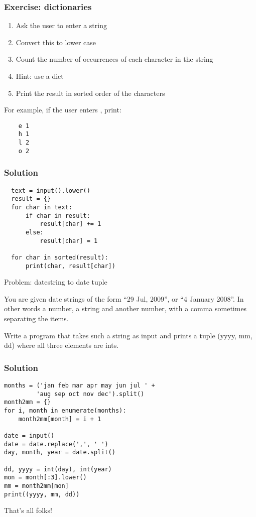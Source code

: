 \documentclass[14pt,compress]{beamer}
\begin{document}
\begin{frame}
  \frametitle{Exercise: dictionaries}
  \begin{enumerate}
  \item Ask the user to enter a string
  \item Convert this to lower case
  \item Count the number of occurrences of each character in the string
  \item Hint: use a dict
  \item Print the result in sorted order of the characters
  \end{enumerate}
  For example, if the user enters , print:
  \begin{lstlisting}
    e 1
    h 1
    l 2
    o 2
  \end{lstlisting}
\end{frame}

\begin{frame}
\frametitle{Solution}
\begin{lstlisting}
  text = input().lower()
  result = {}
  for char in text:
      if char in result:
          result[char] += 1
      else:
          result[char] = 1

  for char in sorted(result):
      print(char, result[char])
\end{lstlisting}
\end{frame}


\begin{frame}[plain]
  {Problem: datestring to date tuple}

  You are given date strings of the form ``29 Jul, 2009'', or ``4 January
  2008''. In other words a number, a string and another number, with a comma
  sometimes separating the items.

  Write a program that takes such a string as input and prints a tuple (yyyy,
  mm, dd) where all three elements are ints.
\end{frame}

\begin{frame}[fragile]
  \frametitle{Solution}
 \small
  \begin{lstlisting}
months = ('jan feb mar apr may jun jul ' +
         'aug sep oct nov dec').split()
month2mm = {}
for i, month in enumerate(months):
    month2mm[month] = i + 1

date = input()
date = date.replace(',', ' ')
day, month, year = date.split()

dd, yyyy = int(day), int(year)
mon = month[:3].lower()
mm = month2mm[mon]
print((yyyy, mm, dd))
\end{lstlisting}
\end{frame}

\begin{frame}
  \centering
  \Huge

  That's all folks!
\end{frame}
\end{document}
